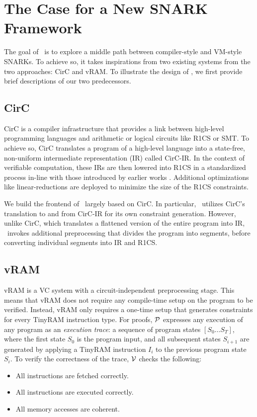 \section{The Case for a New SNARK Framework}
The goal of \CoBBl~is to explore a middle path between compiler-style and VM-style SNARKs. To achieve so, it takes inspirations from two existing systems from the two approaches: CirC and vRAM. To illustrate the design of \CoBBl, we first provide brief descriptions of our two predecessors.

\subsection{CirC}
CirC is a compiler infrastructure that provides a link between high-level programming languages and arithmetic or logical circuits like R1CS or SMT. To achieve so, CirC translates a program of a high-level language into a state-free, non-uniform intermediate representation (IR) called CirC-IR. In the context of verifiable computation, these IRs are then lowered into R1CS in a standardized process in-line with those introduced by earlier works \cite{setty12ginger, wahby14buffet, kosba18xjsnark}. Additional optimizations like linear-reductions are deployed to minimize the size of the R1CS constraints.

We build the frontend of \CoBBl~largely based on CirC. In particular, \CoBBl~utilizes CirC's translation to and from CirC-IR for its own constraint generation. However, unlike CirC, which translates a flattened version of the entire program into IR, \CoBBl~invokes additional preprocessing that divides the program into segments, before converting individual segments into IR and R1CS.

\subsection{vRAM}
vRAM is a VC system with a circuit-independent preprocessing stage. This means that vRAM does not require any compile-time setup on the program to be verified. Instead, vRAM only requires a one-time setup that generates constraints for every TinyRAM instruction type. For proofs, $\P$ expresses any execution of any program as an \emph{execution trace}: a sequence of program states $[S_0\dots S_T]$, where the first state $S_0$ is the program input, and all subsequent states $S_{i+1}$ are generated by applying a TinyRAM instruction $I_i$ to the previous program state $S_i$. To verify the correctness of the trace, $\V$ checks the following:
\begin{itemize}
    \item All instructions are fetched correctly.
    \item All instructions are executed correctly.
    \item All memory accesses are coherent.
\end{itemize}

